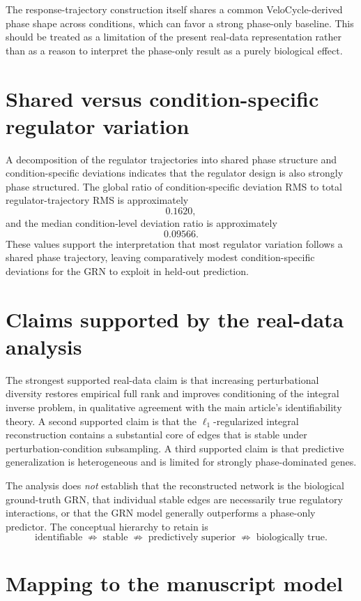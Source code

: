 \documentclass[supplement,onefignum,onetabnum]{siamart251216}
\begin{document}
The response-trajectory construction itself shares a common VeloCycle-derived phase shape across conditions, which can favor a strong phase-only baseline. This should be treated as a limitation of the present real-data representation rather than as a reason to interpret the phase-only result as a purely biological effect.

\section{Shared versus condition-specific regulator variation}

A decomposition of the regulator trajectories into shared phase structure and condition-specific deviations indicates that the regulator design is also strongly phase structured. The global ratio of condition-specific deviation RMS to total regulator-trajectory RMS is approximately
\[
0.1620,
\]
and the median condition-level deviation ratio is approximately
\[
0.09566.
\]
These values support the interpretation that most regulator variation follows a shared phase trajectory, leaving comparatively modest condition-specific deviations for the GRN to exploit in held-out prediction.

\section{Claims supported by the real-data analysis}

The strongest supported real-data claim is that increasing perturbational diversity restores empirical full rank and improves conditioning of the integral inverse problem, in qualitative agreement with the main article's identifiability theory. A second supported claim is that the \(\ell_1\)-regularized integral reconstruction contains a substantial core of edges that is stable under perturbation-condition subsampling. A third supported claim is that predictive generalization is heterogeneous and is limited for strongly phase-dominated genes.

The analysis does \emph{not} establish that the reconstructed network is the biological ground-truth GRN, that individual stable edges are necessarily true regulatory interactions, or that the GRN model generally outperforms a phase-only predictor. The conceptual hierarchy to retain is
\[
\text{identifiable}
\;\not\Rightarrow\;
\text{stable}
\;\not\Rightarrow\;
\text{predictively superior}
\;\not\Rightarrow\;
\text{biologically true}.
\]

\section{Mapping to the manuscript model}
\end{document}
